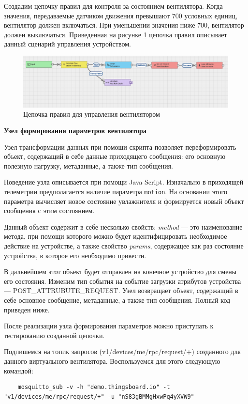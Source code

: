 \documentclass[a4paper,14pt]{extarticle}
\begin{document}
Создадим цепочку правил для контроля за состоянием вентилятора. Когда значения, передаваемые датчиком движения превышают 700 условных единиц, вентилятор должен включаться. При уменьшении значения ниже 700, вентилятор должен выключаться. Приведенная на рисунке \ref{fig:chains} цепочка правил описывает данный сценарий управления устройством.

\begin{figure}[h!]
	\centering
	\includegraphics[width=0.6\linewidth]{images/chains}
	\caption{Цепочка правил для управления вентилятором}
	\label{fig:chains}
\end{figure}


\textbf{Узел формирования параметров вентилятора}

Узел трансформации данных при помощи скрипта позволяет переформировать объект,
содержащий в себе данные приходящего сообщения: его основную полезную нагрузку,
метаданные, а также тип сообщения.

Поведение узла описывается при помощи Java Script. Изначально в приходящей телеметрии
предполагается наличие параметра \texttt{motion}. На основании этого параметра
вычисляет новое состояние увлажнителя и формируется новый объект сообщения с этим
состоянием. 

Данный объект содержит в себе несколько свойств: \textit{method} --- это наименование
метода, при помощи которого можно будет идентифицировать необходимое действие на
устройстве, а также свойство \textit{params}, содержащее как раз состояние устройства, в которое
его необходимо привести. 

В дальнейшем этот объект будет отправлен на конечное
устройство для смены его состояния. Изменим тип события на событие загрузки
атрибутов устройства --- POST\_ATTRUBUTE\_REQUEST. Узел возвращает объект, содержащий в себе основное
сообщение, метаданные, а также тип сообщения. Полный код приведен ниже.




После реализации узла формирования параметров можно приступать к тестированию созданной цепочки. 

Подпишемся на топик запросов (v1/devices/me/rpc/request/+) созданного для данного
виртуального вентилятора. Воспользуемся для этого следующую командой:
\newpage
\begin{lstlisting}
	mosquitto_sub -v -h "demo.thingsboard.io" -t "v1/devices/me/rpc/request/+" -u "nS83gBMMgHxwPq4yXVW9"
\end{lstlisting}
\end{document}
